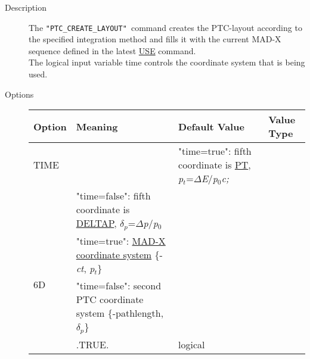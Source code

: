 \begin{description}
	\item[Description] 
The \texttt{"PTC\_CREATE\_LAYOUT" }command creates the PTC-layout according to  the specified integration method and fills it with the current  MAD-X sequence defined in the latest \href{../control/general.html#use}{ USE} command.
\\ The logical input variable time  controls the coordinate system that is being used.
	\item[Options] 
	\text{ \\} %
	
\begin{longtable}{l p{8cm} p{2cm} p{2cm}}
\hline 
\textbf{Option} & \textbf{Meaning} &  \textbf{Default Value} & \textbf{Value Type} \\ 
\hline
TIME
& 
\begin{tabular}{p{0.2cm} p{7.0cm}}
\multirow{2}{*}{5D} & 
"time=true": fifth coordinate is \href{../Introduction/tables.html#canon}{PT}, \textit{p$_t$}=$\Delta$\textit{E}/\textit{p}$_0$\textit{c;} \\
& "time=false": fifth coordinate is \href{../Introduction/tables.html#canon}{DELTAP}, \textit{$\delta$}$_\textit{p}$=$\Delta$\textit{p}/\textit{p}$_0$ \\
\hline
\multirow{2}{*}{6D} & 
"time=true": \href{../Introduction/tables.html#canon}{   MAD-X coordinate system} \{-\textit{ct}, \textit{p$_t$}\} \\
& "time=false": second PTC coordinate system \{-pathlength, \textit{$\delta$}$_\textit{p}$\} \\

\end{tabular}
 & 
.TRUE. & 
logical\\


\end{longtable}
\end{description}
